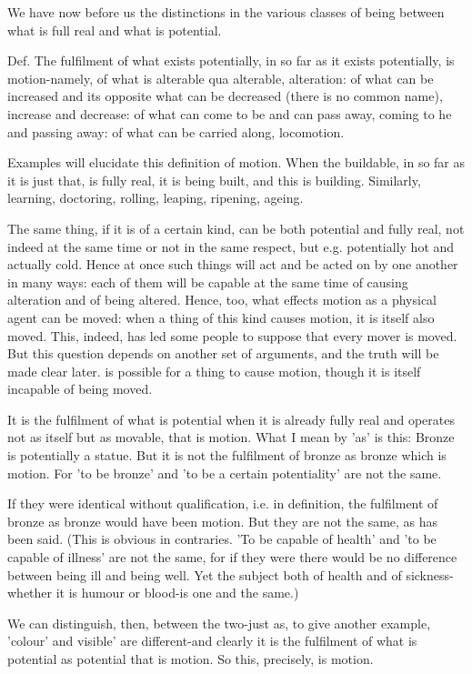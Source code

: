 We have now before us the distinctions in the various classes of being
between what is full real and what is potential. 

Def. The fulfilment of what exists potentially, in so far as it exists
potentially, is motion-namely, of what is alterable qua alterable,
alteration: of what can be increased and its opposite what can be
decreased (there is no common name), increase and decrease: of what
can come to be and can pass away, coming to he and passing away: of
what can be carried along, locomotion. 

Examples will elucidate this definition of motion. When the buildable,
in so far as it is just that, is fully real, it is being built, and
this is building. Similarly, learning, doctoring, rolling, leaping,
ripening, ageing. 

The same thing, if it is of a certain kind, can be both potential
and fully real, not indeed at the same time or not in the same respect,
but e.g. potentially hot and actually cold. Hence at once such things
will act and be acted on by one another in many ways: each of them
will be capable at the same time of causing alteration and of being
altered. Hence, too, what effects motion as a physical agent can be
moved: when a thing of this kind causes motion, it is itself also
moved. This, indeed, has led some people to suppose that every mover
is moved. But this question depends on another set of arguments, and
the truth will be made clear later. is possible for a thing to cause
motion, though it is itself incapable of being moved. 

It is the fulfilment of what is potential when it is already fully
real and operates not as itself but as movable, that is motion. What
I mean by 'as' is this: Bronze is potentially a statue. But it is
not the fulfilment of bronze as bronze which is motion. For 'to be
bronze' and 'to be a certain potentiality' are not the same.

If they were identical without qualification, i.e. in definition,
the fulfilment of bronze as bronze would have been motion. But they
are not the same, as has been said. (This is obvious in contraries.
'To be capable of health' and 'to be capable of illness' are not the
same, for if they were there would be no difference between being
ill and being well. Yet the subject both of health and of sickness-whether
it is humour or blood-is one and the same.) 

We can distinguish, then, between the two-just as, to give another
example, 'colour' and visible' are different-and clearly it is the
fulfilment of what is potential as potential that is motion. So this,
precisely, is motion. 

